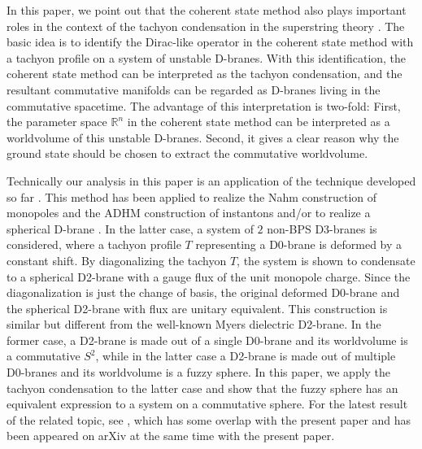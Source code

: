 \documentclass[12pt]{article}
\numberwithin{equation}{section}
\def\real{\mathbb{R}}
\begin{document}
In this paper, we point out that the coherent state method also
plays important roles in the context of 
the tachyon condensation in the superstring theory {\cite{Sen1998}}.
The basic idea is to identify the Dirac-like operator in the coherent state 
method with a tachyon profile on a system of unstable D-branes.
{With this identification, the coherent state method can be interpreted as the tachyon condensation,}
and the resultant commutative manifolds can be regarded as 
D-branes living in the commutative spacetime. 
The advantage of this interpretation is two-fold: 
First, the parameter space $\real^n$ in the coherent state method 
can be interpreted as a worldvolume of this unstable D-branes. 
Second, it gives a clear reason why the ground state should be chosen 
to extract the commutative worldvolume. 

Technically our analysis in this paper is an application 
of the technique developed so far \cite{Terashima2005}.
This method has been applied to realize the Nahm construction of monopoles and 
the ADHM construction of instantons \cite{Hashimoto2005,Hashimoto2006} and/or 
to realize a spherical D-brane \cite{Asakawa2017}. 
In the latter case, 
a system of $2$ non-BPS D3-branes is considered, where 
a tachyon profile $T$ representing a D0-brane is deformed by a constant shift.
By diagonalizing the tachyon $T$, 
the system is shown to condensate to a spherical D2-brane with 
a gauge flux of the unit monopole charge. 
Since the diagonalization is just the change of basis, 
the original deformed D0-brane and the spherical D2-brane 
with flux are unitary equivalent.
This construction is similar but different from the well-known Myers dielectric D2-brane. 
In the former case, a D2-brane is made out of a single D0-brane 
and its worldvolume is a commutative $S^2$,
while in the latter case a D2-brane is made out of multiple D0-branes 
and its worldvolume is a fuzzy sphere. 
In this paper, we apply the tachyon condensation to the latter case 
and show that the fuzzy sphere %
has an equivalent expression to a system on a commutative sphere.
For the latest result of the related topic, 
see \cite{Terashima}, 
which has some overlap with the present paper and 
has been appeared on arXiv at the same time with the present paper. 
\end{document}
